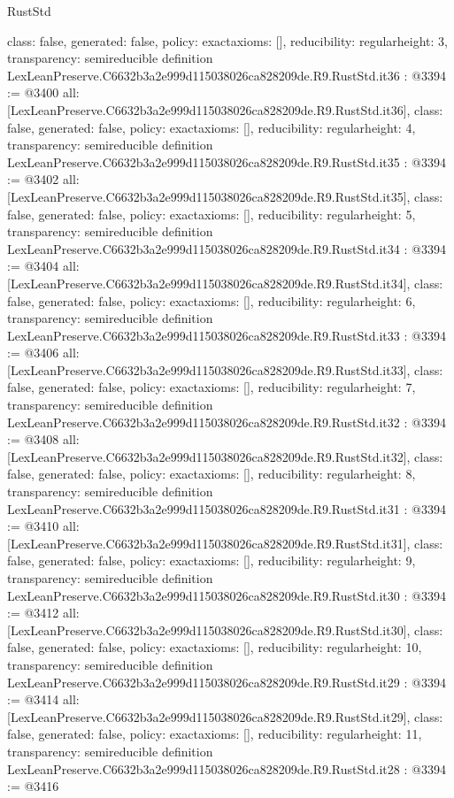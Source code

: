 \begin{lexlean}{RustStd}
\begin{coremodule}
{  class: false,
  generated: false,
  policy: exact{axioms: []},
  reducibility: regular{height: 3},
  transparency: semireducible
}
definition LexLeanPreserve.C6632b3a2e999d115038026ca828209de.R9.RustStd.it36 : @3394 := @3400 {
  all: [LexLeanPreserve.C6632b3a2e999d115038026ca828209de.R9.RustStd.it36],
  class: false,
  generated: false,
  policy: exact{axioms: []},
  reducibility: regular{height: 4},
  transparency: semireducible
}
definition LexLeanPreserve.C6632b3a2e999d115038026ca828209de.R9.RustStd.it35 : @3394 := @3402 {
  all: [LexLeanPreserve.C6632b3a2e999d115038026ca828209de.R9.RustStd.it35],
  class: false,
  generated: false,
  policy: exact{axioms: []},
  reducibility: regular{height: 5},
  transparency: semireducible
}
definition LexLeanPreserve.C6632b3a2e999d115038026ca828209de.R9.RustStd.it34 : @3394 := @3404 {
  all: [LexLeanPreserve.C6632b3a2e999d115038026ca828209de.R9.RustStd.it34],
  class: false,
  generated: false,
  policy: exact{axioms: []},
  reducibility: regular{height: 6},
  transparency: semireducible
}
definition LexLeanPreserve.C6632b3a2e999d115038026ca828209de.R9.RustStd.it33 : @3394 := @3406 {
  all: [LexLeanPreserve.C6632b3a2e999d115038026ca828209de.R9.RustStd.it33],
  class: false,
  generated: false,
  policy: exact{axioms: []},
  reducibility: regular{height: 7},
  transparency: semireducible
}
definition LexLeanPreserve.C6632b3a2e999d115038026ca828209de.R9.RustStd.it32 : @3394 := @3408 {
  all: [LexLeanPreserve.C6632b3a2e999d115038026ca828209de.R9.RustStd.it32],
  class: false,
  generated: false,
  policy: exact{axioms: []},
  reducibility: regular{height: 8},
  transparency: semireducible
}
definition LexLeanPreserve.C6632b3a2e999d115038026ca828209de.R9.RustStd.it31 : @3394 := @3410 {
  all: [LexLeanPreserve.C6632b3a2e999d115038026ca828209de.R9.RustStd.it31],
  class: false,
  generated: false,
  policy: exact{axioms: []},
  reducibility: regular{height: 9},
  transparency: semireducible
}
definition LexLeanPreserve.C6632b3a2e999d115038026ca828209de.R9.RustStd.it30 : @3394 := @3412 {
  all: [LexLeanPreserve.C6632b3a2e999d115038026ca828209de.R9.RustStd.it30],
  class: false,
  generated: false,
  policy: exact{axioms: []},
  reducibility: regular{height: 10},
  transparency: semireducible
}
definition LexLeanPreserve.C6632b3a2e999d115038026ca828209de.R9.RustStd.it29 : @3394 := @3414 {
  all: [LexLeanPreserve.C6632b3a2e999d115038026ca828209de.R9.RustStd.it29],
  class: false,
  generated: false,
  policy: exact{axioms: []},
  reducibility: regular{height: 11},
  transparency: semireducible
}
definition LexLeanPreserve.C6632b3a2e999d115038026ca828209de.R9.RustStd.it28 : @3394 := @3416 {
}
\end{coremodule}
\end{lexlean}
